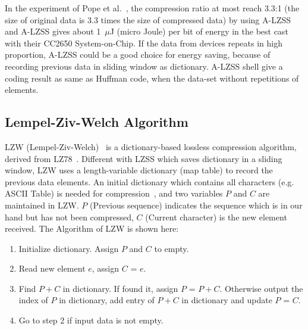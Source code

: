 

In the experiment of Pope et al.~\cite{pope2018accelerometer}, the compression
ratio at most reach 3.3:1 (the size of original data is 3.3 times the size of
compressed data) by using A-LZSS and A-LZSS gives about 1~$\mu$J (micro Joule)
per bit of energy in the best cast with their CC2650 System-on-Chip. If the data
from devices repeats in high proportion, A-LZSS could be a good choice for
energy saving, because of recording previous data in sliding window as
dictionary. A-LZSS shell give a coding result as same as Huffman code, when the
data-set without repetitions of elements.


\subsection{Lempel-Ziv-Welch Algorithm}
LZW (Lempel-Ziv-Welch)~\cite{welch1984technique} is a dictionary-based lossless
compression algorithm, derived from LZ78~\cite{ziv1978compression}. Different
with LZSS which saves dictionary in a sliding window, LZW uses a length-variable
dictionary (map table) to record the previous data elements. An initial
dictionary which contains all characters (e.g. ASCII Table) is needed for
compression~\cite{welch1984technique}, and two variables $P$ and $C$ are
maintained in LZW. $P$ (Previous sequence) indicates the sequence which is in
our hand but has not been compressed, $C$ (Current character) is the new element
received. The Algorithm of LZW is shown here:

\begin{enumerate}
    \item Initialize dictionary. Assign $P$ and $C$ to empty.
    \item Read new element $e$, assign $C$ = $e$.
    \item Find $P+C$ in dictionary. If found it, assign $P$ = $P+C$. Otherwise
    output the index of $P$ in dictionary, add entry of $P+C$ in dictionary and
    update $P$ = $C$.
    \item Go to step 2 if input data is not empty.
\end{enumerate}

